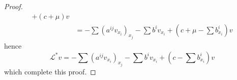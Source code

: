 \begin{theorem}
\begin{proof}
\begin{equation*}
\begin{aligned}
                +\left(c+\mu\right)v                                                                               \\
                 & =-\sum \left(a^{ij}v_{x_i}\right)_{x_j} - \sum b^i v_{x_i} +\left(c+\mu-\sum b^i_{x_i}\right) v
            \end{aligned}
        \end{equation*}
        hence
        \begin{equation*}
            \mathcal{L}^* v
            =
            -\sum \left(a^{ij}v_{x_i}\right)_{x_j} - \sum b^i v_{x_i} +\left(c-\sum b^i_{x_i}\right) v
        \end{equation*}
        which complete this proof.
    \end{proof}
\end{theorem}

\subsection{}


